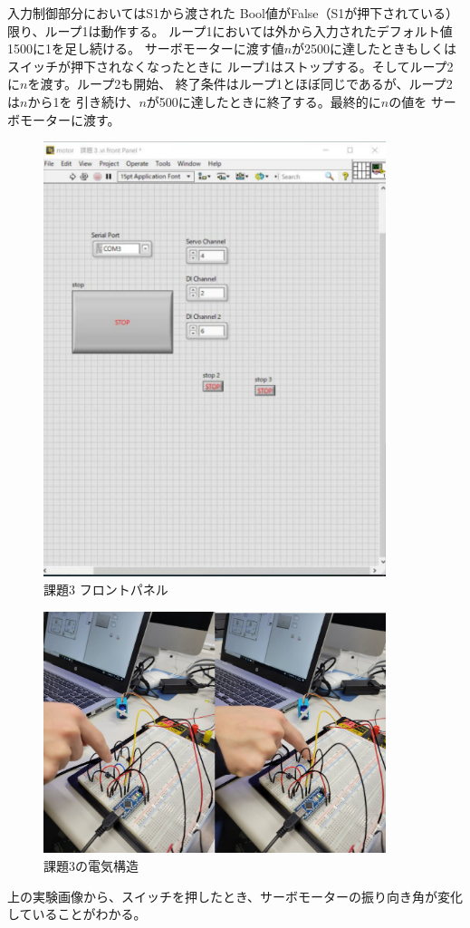 \documentclass[a4paper,titlepage,11pt]{ltjsarticle}
\begin{document}
入力制御部分においてはS1から渡された
Bool値がFalse（S1が押下されている）限り、ループ1は動作する。
ループ1においては外から入力されたデフォルト値1500に1を足し続ける。
サーボモーターに渡す値$n$が2500に達したときもしくはスイッチが押下されなくなったときに
ループ1はストップする。そしてループ2に$n$を渡す。ループ2も開始、
終了条件はループ1とほぼ同じであるが、ループ2は$n$から1を
引き続け、$n$が500に達したときに終了する。最終的に$n$の値を
サーボモーターに渡す。
\begin{figure}[H]
  \begin{center}
    \includegraphics[width=100mm]{kadai3_f.pdf}
    \caption{課題3 フロントパネル}
  \end{center}
\end{figure}
\begin{figure}[H]
  \begin{center}
    \includegraphics[width=100mm]{kadai3_h.pdf}
    \caption{課題3の電気構造}
  \end{center}
\end{figure}
上の実験画像から、スイッチを押したとき、サーボモーターの振り向き角が変化
していることがわかる。
\end{document}
